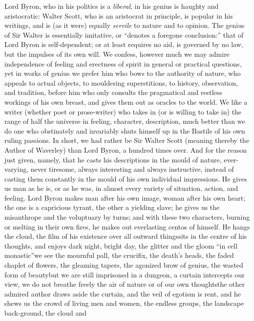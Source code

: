 Lord Byron, who in his politics is a \emph{liberal}, in his genius is haughty
and aristocratic: Walter Scott, who is an aristocrat in principle, is
popular in his writings, and is (as it were) equally \emph{servile} to nature
and to opinion. The genius of Sir Walter is essentially imitative, or
``denotes a foregone conclusion:'' that of Lord Byron is self-dependent;
or at least requires no aid, is governed by no law, but the impulses of
its own will. We confess, however much we may admire independence of
feeling and erectness of spirit in general or practical questions, yet
in works of genius we prefer him who bows to the authority of nature,
who appeals to actual objects, to mouldering superstitions, to history,
observation, and tradition, before him who only consults the pragmatical
and restless workings of his own breast, and gives them out as oracles
to the world. We like a writer (whether poet or prose-writer) who takes
in (or is willing to take in) the range of half the universe in feeling,
character, description, much better than we do one who obstinately and
invariably shuts himself up in the Bastile of his own ruling passions.
In short, we had rather be Sir Walter Scott (meaning thereby the Author
of Waverley) than Lord Byron, a hundred times over. And for the reason
just given, namely, that he casts his descriptions in the mould of
nature, ever-varying, never tiresome, always interesting and always
instructive, instead of casting them constantly in the mould of his
own individual impressions. He gives us man as he is, or as he was, in
almost every variety of situation, action, and feeling. Lord Byron
makes man after his own image, woman after his own heart; the one is
a capricious tyrant, the other a yielding slave; he gives us the
misanthrope and the voluptuary by turns; and with these two characters,
burning or melting in their own fires, he makes out everlasting centos
of himself. He hangs the cloud, the film of his existence over all
outward things\textemdash sits in the centre of his thoughts, and enjoys dark
night, bright day, the glitter and the gloom ``in cell monastic''\textemdash we see
the mournful pall, the crucifix, the death's heads, the faded chaplet of
flowers, the gleaming tapers, the agonized brow of genius, the wasted
form of beauty\textemdash but we are still imprisoned in a dungeon, a curtain
intercepts our view, we do not breathe freely the air of nature or of
our own thoughts\textemdash the other admired author draws aside the curtain, and
the veil of egotism is rent, and he shews us the crowd of living men and
women, the endless groups, the landscape back-ground, the cloud and
